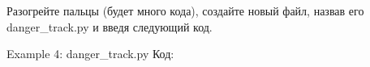 \documentclass[12pt]{book}
\begin{document}
Разогрейте пальцы (будет много кода), создайте новый файл, назвав его danger\_track.py и введя следующий код.

Example 4: danger\_track.py
Код:













\end{document}
